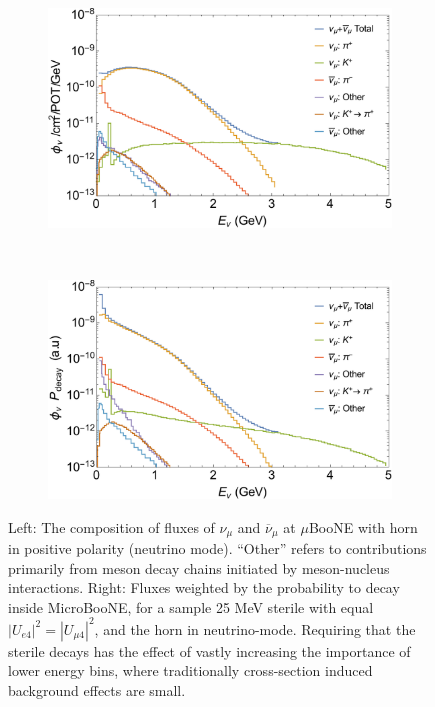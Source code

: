 \documentclass[11pt, a4paper]{article}
\def\muboone{MicroBooNE}
\begin{document}
\begin{figure}[t]
\center
\begin{subfigure}[t]{0.5\textwidth}
\includegraphics[width=\textwidth]{figures/microBooNE_flux.pdf} 
\end{subfigure}%
~
\begin{subfigure}[t]{0.475\textwidth}
\includegraphics[width=\textwidth]{figures/microBooNE_flux_weighted.pdf}
\end{subfigure}
\caption{\label{fig:flux_plots} Left: The composition of fluxes of $\nu_\mu$ and $\overline{\nu}_\mu$ at $\mu$BooNE with horn in positive polarity (neutrino mode). ``Other'' refers to contributions primarily from meson decay chains initiated by meson-nucleus interactions. Right: Fluxes weighted by the probability to decay inside \muboone, for a sample 25 MeV sterile with equal $|U_{e4}|^2 = |U_{\mu 4}|^2$, and the horn in neutrino-mode. Requiring that the sterile decays has the effect of vastly increasing the importance of lower energy bins, where traditionally cross-section induced background effects are small.}

\end{figure}
\end{document}
